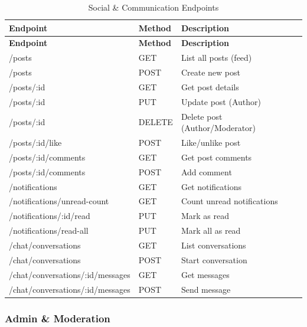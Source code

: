 \documentclass[12pt,a4paper]{article}
\begin{document}
\begin{longtable}{>{\small\ttfamily}p{6.5cm}%
                  >{\small\centering\arraybackslash}p{1.3cm}%
                  >{\small}p{6.7cm}}
\caption{Social \& Communication Endpoints} \\

\rowcolor{Teal}
\color{white}\normalfont\bfseries Endpoint & \color{white}\bfseries Method & \color{white}\bfseries Description \\
\endfirsthead
\rowcolor{Teal}
\color{white}\normalfont\bfseries Endpoint & \color{white}\bfseries Method & \color{white}\bfseries Description \\
\endhead

\midrule
\rowcolor{LightTeal}/posts & GET & List all posts (feed) \\
/posts & POST & Create new post \\
\rowcolor{LightTeal}/posts/:id & GET & Get post details \\
/posts/:id & PUT & Update post (Author) \\
\rowcolor{LightTeal}/posts/:id & DELETE & Delete post (Author/Moderator) \\
/posts/:id/like & POST & Like/unlike post \\
\rowcolor{LightTeal}/posts/:id/comments & GET & Get post comments \\
/posts/:id/comments & POST & Add comment \\
\rowcolor{LightTeal}/notifications & GET & Get notifications \\
/notifications/unread-count & GET & Count unread notifications \\
\rowcolor{LightTeal}/notifications/:id/read & PUT & Mark as read \\
/notifications/read-all & PUT & Mark all as read \\
\rowcolor{LightTeal}/chat/conversations & GET & List conversations \\
/chat/conversations & POST & Start conversation \\
\rowcolor{LightTeal}/chat/conversations/:id/messages & GET & Get messages \\
/chat/conversations/:id/messages & POST & Send message \\
\bottomrule
\end{longtable}

\subsubsection{Admin \& Moderation}
\end{document}
